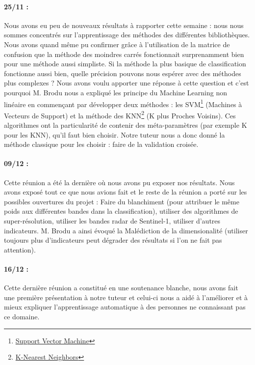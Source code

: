 \documentclass[a4paper,10pt]{article}
\begin{document}
\paragraph{25/11 :} Nous avons eu peu de nouveaux résultats à rapporter cette semaine : nous nous sommes concentrés sur l'apprentissage des méthodes des différentes bibliothèques. Nous avons quand même pu confirmer grâce à l'utilisation de la matrice de confusion que la méthode des moindres carrés fonctionnait surprenamment bien pour une méthode aussi simpliste. Si la méthode la plus basique de classification fonctionne aussi bien, quelle précision pouvons nous espérer avec des méthodes plus complexes ? Nous avons voulu apporter une réponse à cette question et c'est pourquoi M. Brodu nous a expliqué les principe du Machine Learning non linéaire en commençant par développer deux méthodes : les SVM\footnote{\href{https://en.wikipedia.org/wiki/Support_vector_machine}{Support Vector Machine}} (Machines à Vecteurs de Support) et la méthode des KNN\footnote{\href{https://en.wikipedia.org/wiki/K-nearest_neighbors_algorithm}{K-Nearest Neighbors}} (K plus Proches Voisins). Ces algorithmes ont la particularité de contenir des méta-paramètres (par exemple K pour les KNN), qu'il faut bien choisir. Notre tuteur nous a donc donné la méthode classique pour les choisir : faire de la validation croisée.
\paragraph{09/12 :} Cette réunion a été la dernière où nous avons pu exposer nos résultats. Nous avons exposé tout ce que nous avions fait et le reste de la réunion a porté sur les possibles ouvertures du projet : Faire du blanchiment (pour attribuer le même poids aux différentes bandes dans la classification), utiliser des algorithmes de super-résolution, utiliser les bandes radar de Sentinel-1, utiliser d'autres indicateurs. M. Brodu a ainsi évoqué la Malédiction de la dimensionalité (utiliser toujours plus d'indicateurs peut dégrader des résultats si l'on ne fait pas attention).
\paragraph{16/12 :}Cette dernière réunion a constitué en une soutenance blanche, nous avons fait une première présentation à notre tuteur et celui-ci nous a aidé à l'améliorer et à mieux expliquer l'apprentissage automatique à des personnes ne connaissant pas ce domaine.
\end{document}
